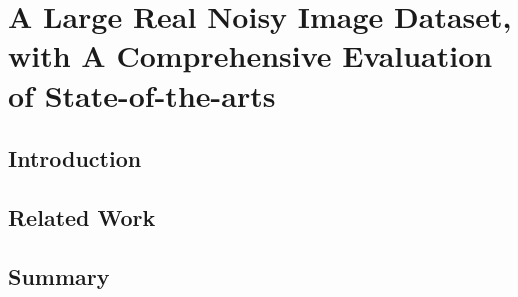 %
\chapter{A Large Real Noisy Image Dataset, with A Comprehensive Evaluation of State-of-the-arts}
\label{sec:dataset}


\blindtext

\section{Introduction}
\label{sec:real:intro}

\blindtext

\section{Related Work}
\label{sec:real:related}

\blindtext


\section{Summary}
\label{sec:real:summary}

\blindtext
